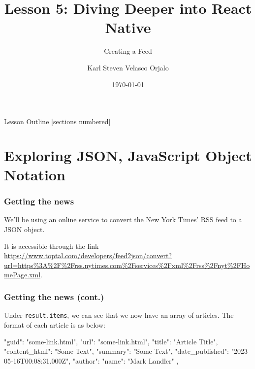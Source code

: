 \documentclass{beamer}
\title{Lesson 5: Diving Deeper into React Native}
\subtitle{Creating a Feed}
\date{\today}
\author{Karl Steven Velasco Orjalo}
\institute{React Native Quickstart}
\begin{document}
  \maketitle

  \begin{frame}{Lesson Outline}
    [sections numbered]
    \tableofcontents
  \end{frame}

  \section{Exploring JSON, JavaScript Object Notation}
  \begin{frame}[fragile]
    \frametitle{Getting the news}
    We'll be using an online service to convert the New York Times' RSS feed to a JSON object. 

    It is accessible through the link \url{https://www.toptal.com/developers/feed2json/convert?url=https%3A%2F%2Frss.nytimes.com%2Fservices%2Fxml%2Frss%2Fnyt%2FHomePage.xml}.
  \end{frame}
  \begin{frame}[fragile]
    \frametitle{Getting the news (cont.)}
    Under \verb|result.items|, we can see that we now have an array of articles. The format of each article is as below: 

    \begin{jscodesmall}
{
  "guid": "some-link.html",
  "url": "some-link.html",
  "title": "Article Title",
  "content_html": "Some Text",
  "summary": "Some Text",
  "date_published": "2023-05-16T00:08:31.000Z",
  "author": {
    "name": "Mark Landler"
  }
},
    \end{jscodesmall}
  \end{frame}
  
\end{document}
